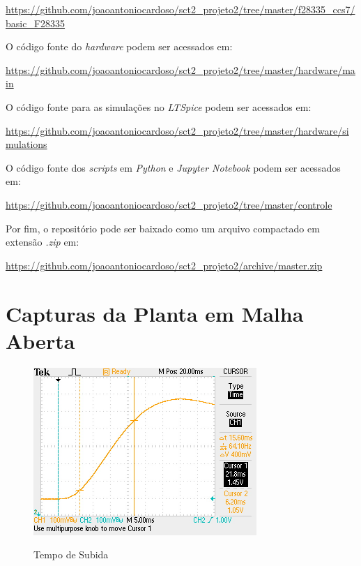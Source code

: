 \documentclass[
	12pt,				%
	article,			%
	openright,			%
	oneside,
	a4paper,			%
	chapter=TITLE,		%
	section=TITLE,		%
	english,			%
	french,				%
	spanish,			%
	brazil,				%
]{abntex2}
\begin{document}
\begin{apendicesenv}
            \url{https://github.com/joaoantoniocardoso/sct2_projeto2/tree/master/f28335_ccs7/basic_F28335}
            
            O código fonte do \textit{hardware} podem ser acessados em:
            
            \url{https://github.com/joaoantoniocardoso/sct2_projeto2/tree/master/hardware/main}
            
            O código fonte para as simulações no \textit{LTSpice} podem ser acessados em:
            
            \url{https://github.com/joaoantoniocardoso/sct2_projeto2/tree/master/hardware/simulations}
            
            O código fonte dos \textit{scripts} em \textit{Python} e \textit{Jupyter Notebook} podem ser acessados em:
            
            \url{https://github.com/joaoantoniocardoso/sct2_projeto2/tree/master/controle}
            
            Por fim, o repositório pode ser baixado como um arquivo compactado em extensão \textit{.zip} em:
            
            \url{https://github.com/joaoantoniocardoso/sct2_projeto2/archive/master.zip}
            
        \clearpage
	
        \chapter{Capturas da Planta em Malha Aberta}
        	\label{ap-ftma}
        	
        	\FloatBarrier
        	\begin{figure}[htbp]
            	\centering
            	\caption{Tempo de Subida}
            	\includegraphics[width=\textwidth,height=240px,keepaspectratio]{imgs/ftma/rise_time.JPG}
            	\label{fig-ftma-rise_time}
        	\end{figure}			
        

\end{apendicesenv}
\end{document}

